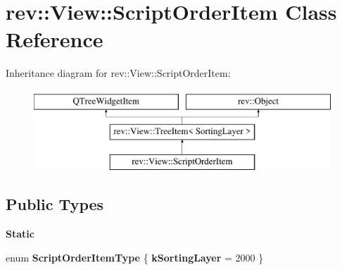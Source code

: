 \hypertarget{classrev_1_1_view_1_1_script_order_item}{}\section{rev\+::View\+::Script\+Order\+Item Class Reference}
\label{classrev_1_1_view_1_1_script_order_item}
Inheritance diagram for rev\+::View\+::Script\+Order\+Item\+:\begin{figure}[H]
\begin{center}
\leavevmode
\includegraphics[height=3.000000cm]{classrev_1_1_view_1_1_script_order_item}
\end{center}
\end{figure}
\subsection*{Public Types}
\begin{Indent}\textbf{ Static}\par
\begin{DoxyCompactItemize}
\item 
\mbox{\label{classrev_1_1_view_1_1_script_order_item_a5935913914915f1a653a589f96aa5845}} 
enum {\bfseries Script\+Order\+Item\+Type} \{ {\bfseries k\+Sorting\+Layer} = 2000
 \}
\end{DoxyCompactItemize}
\end{Indent}
